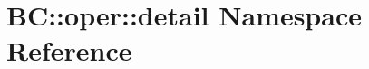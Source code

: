 \hypertarget{namespaceBC_1_1oper_1_1detail}{}\section{BC\+:\+:oper\+:\+:detail Namespace Reference}
\label{namespaceBC_1_1oper_1_1detail}
